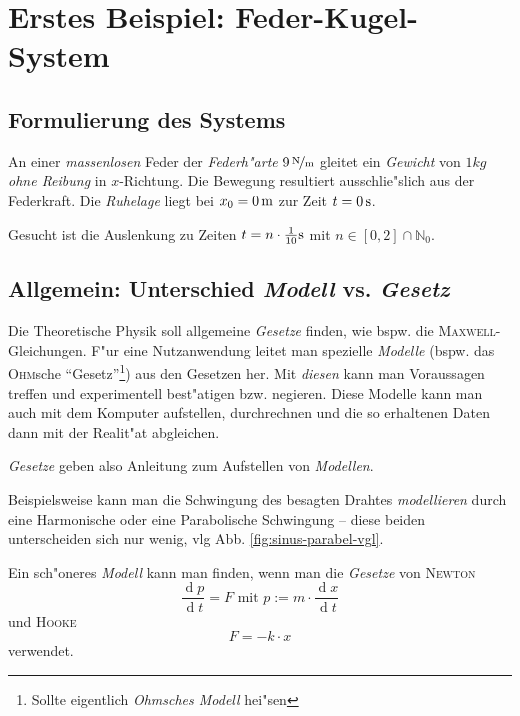 \documentclass[a4paper]{book}
\newcommand{\diff}{\ensuremath{\operatorname d}}
\begin{document}
\section{Erstes Beispiel: Feder-Kugel-System}
\label{sec:erstes_beispiel:_feder_kugel_system}


\subsection{Formulierung des Systems}
\label{sec:formulierung_des_systems}

An einer \emph{massenlosen} Feder der \emph{Federh"arte} $\unitfrac[9] N m$
gleitet ein \emph{Gewicht} von $1\unit{kg}$ \emph{ohne Reibung} in
$x$-Richtung. Die Bewegung resultiert ausschlie"slich aus der
Federkraft. Die \emph{Ruhelage} liegt bei $x_0 = \unit[0] m$ zur Zeit
$t= \unit[0] s$.

Gesucht ist die Auslenkung zu Zeiten $t = n \cdot \frac{1}{10}\unit s$ mit $n \in
[0,2] \cap \mathbb N_0$.



\subsection{Allgemein: Unterschied \emph{Modell} vs. \emph{Gesetz}}
\label{sec:allg_untersch_emphm_vs._emphg}

Die Theoretische Physik soll allgemeine \emph{Gesetze} finden, wie
bspw. die \textsc{Maxwell}-Gleichungen. F"ur eine Nutzanwendung leitet
man spezielle \emph{Modelle} (bspw. das \textsc{Ohm}sche
"`Gesetz"'\footnote{Sollte eigentlich \emph{Ohmsches Modell} hei"sen})
aus den Gesetzen her. Mit \emph{diesen} kann man Voraussagen treffen
und experimentell best"atigen bzw. negieren. Diese Modelle kann man
auch mit dem Komputer aufstellen, durchrechnen und die so erhaltenen
Daten dann mit der Realit"at abgleichen.

\emph{Gesetze} geben also Anleitung zum Aufstellen von
\emph{Modellen}.

Beispielsweise kann man die Schwingung des besagten Drahtes
\emph{modellieren} durch eine Harmonische oder eine Parabolische
Schwingung -- diese beiden unterscheiden sich nur wenig, vlg
Abb. \ref{fig:sinus-parabel-vgl}.

Ein sch"oneres \emph{Modell} kann man finden, wenn man die
\emph{Gesetze} von \textsc{Newton}
\begin{equation}
  \label{eq:1}
  \frac{\diff p}{\diff t} = F \text{ mit }  p := m \cdot \frac{\diff
    x}{\diff t} \tag{1.4}
\end{equation}
und \textsc{Hooke}
\begin{equation}
  \label{eq:2}
  F = - k \cdot x \tag{1.6}
\end{equation}
verwendet.
\end{document}
